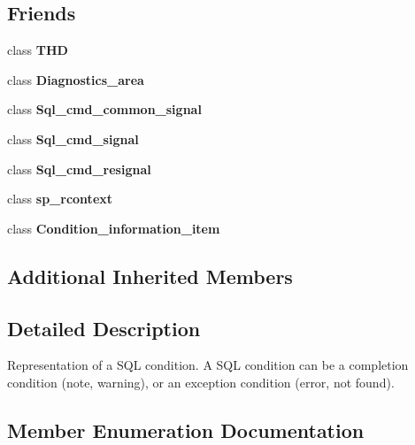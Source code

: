 \subsection*{Friends}
\begin{DoxyCompactItemize}
\item 
\mbox{\label{classSql__condition_a786121acb870730886bdd44c874c0c57}} 
class {\bfseries T\+HD}
\item 
\mbox{\label{classSql__condition_ad0f14597816e36ea55ac31481d7caa8d}} 
class {\bfseries Diagnostics\+\_\+area}
\item 
\mbox{\label{classSql__condition_a66b5162e2257930135f0a27713d5b39d}} 
class {\bfseries Sql\+\_\+cmd\+\_\+common\+\_\+signal}
\item 
\mbox{\label{classSql__condition_adc30903f21322b4b855010a1cbe8cff5}} 
class {\bfseries Sql\+\_\+cmd\+\_\+signal}
\item 
\mbox{\label{classSql__condition_a8f16ac7fb80e5f7429f188c30d7cacc5}} 
class {\bfseries Sql\+\_\+cmd\+\_\+resignal}
\item 
\mbox{\label{classSql__condition_a89161be45522adabc60dffcac1ffe61c}} 
class {\bfseries sp\+\_\+rcontext}
\item 
\mbox{\label{classSql__condition_abbea605f968f533b0caf50c050ac455a}} 
class {\bfseries Condition\+\_\+information\+\_\+item}
\end{DoxyCompactItemize}
\subsection*{Additional Inherited Members}


\subsection{Detailed Description}
Representation of a S\+QL condition. A S\+QL condition can be a completion condition (note, warning), or an exception condition (error, not found). 

\subsection{Member Enumeration Documentation}
\mbox{\label{classSql__condition_ab0602581e19cddb609bfe10c44be4e83}} 
